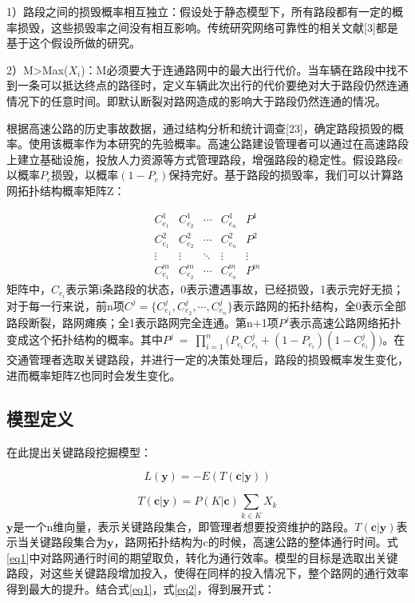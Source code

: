 			1）路段之间的损毁概率相互独立：假设处于静态模型下，所有路段都有一定的概率损毁，这些损毁率之间没有相互影响。传统研究网络可靠性的相关文献[3]都是基于这个假设所做的研究。

			2）M>Max($X_i$)：M必须要大于连通路网中的最大出行代价。当车辆在路段中找不到一条可以抵达终点的路径时，定义车辆此次出行的代价要绝对大于路段仍然连通情况下的任意时间。即默认断裂对路网造成的影响大于路段仍然连通的情况。

			根据高速公路的历史事故数据，通过结构分析和统计调查[23]，确定路段损毁的概率。使用该概率作为本研究的先验概率。高速公路建设管理者可以通过在高速路段上建立基础设施，投放人力资源等方式管理路段，增强路段的稳定性。假设路段$e$以概率$P_e$损毁，以概率$(1-P_e)$保持完好。基于路段的损毁率，我们可以计算路网拓扑结构概率矩阵Z：

		\[\begin{array}{*{20}{c}}
		{C_{{e_1}}^1}&{C_{{e_2}}^1}& \cdots &{C_{{e_n}}^1}&{{P^1}}\\
		{C_{{e_1}}^2}&{C_{{e_2}}^2}& \cdots &{C_{{e_n}}^2}&{{P^2}}\\
		 \vdots & \vdots & \ddots & \vdots & \vdots \\
		{C_{{e_1}}^m}&{C_{{e_2}}^m}& \cdots &{C_{{e_n}}^m}&{{P^m}}
		\end{array}\]
		矩阵中，$C_{{e_i}}$表示第i条路段的状态，0表示遭遇事故，已经损毁，1表示完好无损；对于每一行来说，前n项$C^j = \{{C_{{e_1}}^j},{C_{{e_2}}^j},\cdots,{C_{{e_n}}^j}\}$表示路网的拓扑结构，全0表示全部路段断裂，路网瘫痪；全1表示路网完全连通。第n+1项$P^j$表示高速公路网络拓扑变成这个拓扑结构的概率。其中$P^j \ = \ \prod\limits_{i = 1}^n {({P_{{e_i}}}C_{{e_i}}^j + (1 - {P_{{e_i}}})} (1 - C_{{e_i}}^j))$。在交通管理者选取关键路段，并进行一定的决策处理后，路段的损毁概率发生变化，进而概率矩阵Z也同时会发生变化。
			\subsection{模型定义}
			在此提出关键路段挖掘模型：

			\begin{equation}
			L(\bm{y}) = -E(T(\bm{c}|\bm{y} ))
			\label{eq1}
			\end{equation}

			\begin{equation}
			T(\bm{c}|\bm{y} ) = P(K|\bm{c})\sum\limits_{k \in K} {{X_k}} 
			\label{eq2}
			\end{equation}
			$\bm{y} $是一个n维向量，表示关键路段集合，即管理者想要投资维护的路段。$T(\bm{c}|\bm{y} )$表示当关键路段集合为$\bm{y}$，路网拓扑结构为c的时候，高速公路的整体通行时间。式\ref{eq1}中对路网通行时间的期望取负，转化为通行效率。模型的目标是选取出关键路段，对这些关键路段增加投入，使得在同样的投入情况下，整个路网的通行效率得到最大的提升。结合式\ref{eq1}，式\ref{eq2}，得到展开式：

